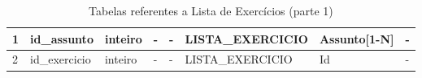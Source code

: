 \documentclass[graduacao,brazil]{ThesisPUC}
\begin{document}
\begin{table}[H]
{\begin{tabular}{|l|l|l|l|l|l|l|l|}
    1                       & id\_assunto    & inteiro              & -               & -                & LISTA\_EXERCICIO & Assunto[1-N]   & -               \\ \hline
    2                       & id\_exercicio  & inteiro              & -               & -                & LISTA\_EXERCICIO & Id             & -               \\ \hline
    \end{tabular}
    }
    \caption {Tabelas referentes a Lista de Exerc\'{i}cios (parte 1)}
\end{table}

\end{document}

